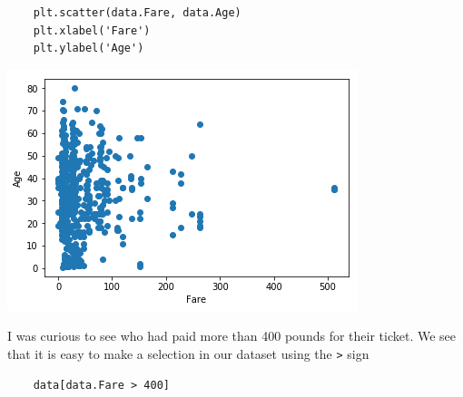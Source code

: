 \documentclass[11pt]{article}
\begin{document}
\begin{verbatim}
    plt.scatter(data.Fare, data.Age)
    plt.xlabel('Fare')
    plt.ylabel('Age')
\end{verbatim}

\begin{center}
\includegraphics[width=.9\linewidth]{output_15_1.png}
\end{center}

I was curious to see who had paid more than 400 pounds for their ticket.
We see that it is easy to make a selection in our dataset using the \texttt{>}
sign

\begin{verbatim}
    data[data.Fare > 400]
\end{verbatim}
\end{document}
